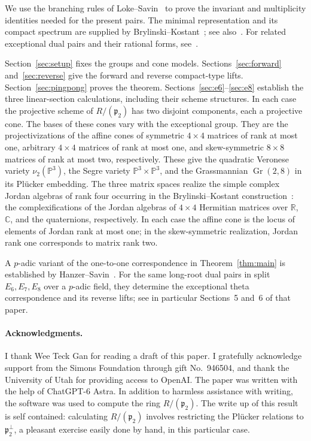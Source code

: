 \documentclass[11pt]{article}
\newcommand{\C}{\mathbb C}
\newcommand{\R}{\mathbb R}
\newcommand{\PP}{\mathbb P}
\newcommand{\Gr}{\operatorname{Gr}}
\newcommand{\fp}{\mathfrak p}
\theoremstyle{definition}
\numberwithin{equation}{section}
\begin{document}
We use the branching rules of Loke--Savin~\cite[Proposition~5.1]{LS19}
to prove the invariant and multiplicity identities needed for the present pairs. The minimal
representation and its compact spectrum are supplied by
Brylinski--Kostant~\cite{BK}; see also~\cite{GS}.
For related exceptional dual pairs and their rational forms, see~\cite{LS15}.

Section~\ref{sec:setup} fixes the groups and cone models.
Sections~\ref{sec:forward} and~\ref{sec:reverse} give the forward and
reverse compact-type lifts. Section~\ref{sec:pingpong} proves the theorem.
Sections~\ref{sec:e6}--\ref{sec:e8} establish the three linear-section
calculations, including their scheme structures. In each case the projective
scheme of $R/(\fp_2)$ has two disjoint components, each a projective cone.
The bases of these cones vary with the exceptional group.
They are the projectivizations of the affine cones of symmetric $4\times4$
matrices of rank at most one, arbitrary $4\times4$ matrices of rank at most
one, and skew-symmetric $8\times8$ matrices of rank at most two, respectively.
These give the quadratic Veronese variety $\nu_2(\PP^3)$, the Segre variety
$\PP^3\times\PP^3$, and the Grassmannian $\Gr(2,8)$ in its Pl\"ucker embedding.
The three matrix spaces realize the simple complex Jordan algebras of rank
four occurring in the Brylinski--Kostant construction~\cite{BK}: the
complexifications of the Jordan algebras of $4\times4$ Hermitian matrices
over $\R$, $\C$, and the quaternions, respectively.
In each case the affine cone is the locus of elements of Jordan rank at
most one; in the skew-symmetric realization, Jordan rank one corresponds
to matrix rank two.

A $p$-adic variant of the one-to-one correspondence in
Theorem~\ref{thm:main} is established by Hanzer--Savin~\cite{HS25}.
For the same long-root dual pairs in split $E_6,E_7,E_8$ over a $p$-adic
field, they determine the exceptional theta correspondence and its reverse
lifts; see in particular Sections~5 and~6 of that paper.

\paragraph{Acknowledgments.}
I thank Wee Teck Gan for reading a draft of this paper. I gratefully
acknowledge support from the Simons Foundation through gift No.~946504,
and thank the University of Utah for providing access to OpenAI. 
The paper was written with the help of ChatGPT-6 Astra. 
In addition to harmless assistance with writing, the software was used to compute the ring 
$R/(\fp_2)$. The write up of this result is self contained: 
calculating $R/(\fp_2)$ involves restricting the Pl\"ucker relations to $\fp_2^{\perp}$, 
a pleasant exercise easily done by hand, in this particular case. 
\end{document}
